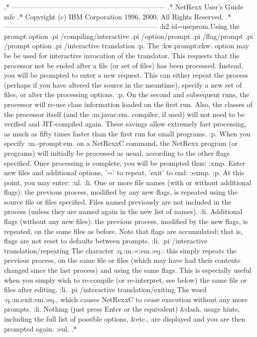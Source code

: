 .* ------------------------------------------------------------------
.* NetRexx User's Guide                                              mfc
.* Copyright (c) IBM Corporation 1996, 2000.  All Rights Reserved.
.* ------------------------------------------------------------------
:h2 id=useprom.Using the prompt option
.pi /compiling/interactive
.pi /option/prompt
.pi /flag/prompt
.pi /prompt option
.pi /interactive translation
:p.
The :kw.prompt:ekw. option may be be used for interactive invocation of
the translator.  This requests that the processor not be ended after a
file (or set of files) has been processed.  Instead, you will be
prompted to enter a new request.  This can either repeat the process
(perhaps if you have altered the source in the meantime), specify a new
set of files, or alter the processing options.
:p.
On the second and subsequent runs, the processor will re-use class
information loaded on the first run.  Also, the classes of the processor
itself (and the :m.javac:em. compiler, if used) will not need to be
verified and JIT-compiled again.  These savings allow extremely fast
processing, as much as fifty times faster than the first run for small
programs.
:p.
When you specify :m.-prompt:em. on a NetRexxC command, the NetRexx
program (or programs) will initially be processed as usual, according to
the other flags specified.  Once processing is complete, you will be
prompted thus:
:xmp.
Enter new files and additional options, '=' to repeat, 'exit' to end:
:exmp.
:p.
At this point, you may enter:
:ul.
:li.
One or more file names (with or without additional flags): the previous
process, modified by any new flags, is repeated using the source file
or files specified.  Files named previously are not included in the
process (unless they are named again in the new list of names).
:li.
Additional flags (without any new files): the previous process, modified
by the new flags, is repeated, on the same files as before.
Note that flags are accumulated; that is, flags are not reset to
defaults between prompts.
:li.
.pi /interactive translation/repeating
The character :q.:m.=:em.:eq.: this simply repeats the previous process,
on the same file or files (which may have had their contents changed
since the last process) and using the same flags.  This is especially
useful when you simply wish to re-compile (or re-interpret, see below)
the same file or files after editing.
:li.
.pi /interactive translation/exiting
The word :q.:m.exit:em.:eq., which causes NetRexxC to cease execution
without any more prompts.
:li.
Nothing (just press Enter or the equivalent) &dash. usage hints, including
the full list of possible options, &etc., are displayed and you are then
prompted again.
:eul.
.*
